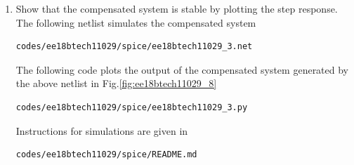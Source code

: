 \begin{enumerate}[label=\thesection.\arabic*.,ref=\thesection.\theenumi]
%


\item Show that the compensated system is stable by plotting the step response.
\solution
The following netlist simulates the compensated system
\begin{lstlisting}
codes/ee18btech11029/spice/ee18btech11029_3.net
\end{lstlisting}
The following code plots the output of the compensated system generated by the above netlist in Fig.\ref{fig:ee18btech11029_8}
\begin{lstlisting}
codes/ee18btech11029/spice/ee18btech11029_3.py
\end{lstlisting}
Instructions for simulations are given in
\begin{lstlisting}
codes/ee18btech11029/spice/README.md
\end{lstlisting}


\end{enumerate}
